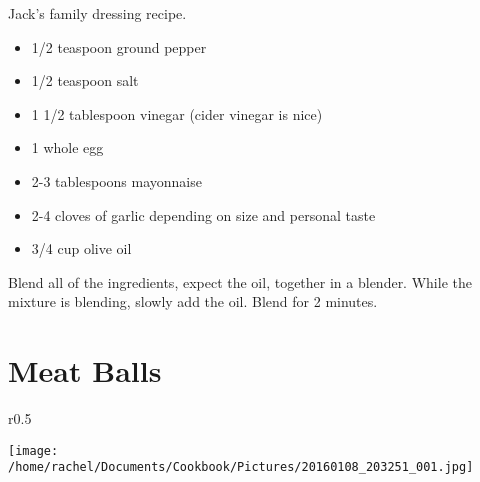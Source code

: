 \documentclass{article}
\begin{document}
\vspace{5mm}

Jack's family dressing recipe. 
 
\vspace{5mm}
{\selectfont 
    \begin{itemize}[noitemsep]
    
      \item[] 1/2 teaspoon ground pepper
      \item[] 1/2 teaspoon salt
      \item[] 1 1/2 tablespoon vinegar (cider vinegar is nice)
      \item[] 1 whole egg
      \item[] 2-3 tablespoons mayonnaise
      \item[] 2-4 cloves of garlic depending on size and personal taste
      \item[] 3/4 cup olive oil
      
    \end{itemize}
    }
\vspace{5mm}
    
Blend all of the ingredients, expect the oil, together in a blender. While the mixture is blending, slowly add the oil. Blend for 2 minutes.

\restoregeometry




\section*{\fontsize{25}{15}\selectfont Meat Balls}
\begin{wrapfigure}{r}{0.5\textwidth}
\
  \begin{center}
 	\hfill\begin{minipage}{\textwidth}\centering
 	\vspace*{-6cm}
		\texttt{[image: /home/rachel/Documents/Cookbook/Pictures/20160108\_203251\_001.jpg]}
	\end{minipage}  
	\end{center}

\end{wrapfigure}



\vspace{10mm}
\end{document}
